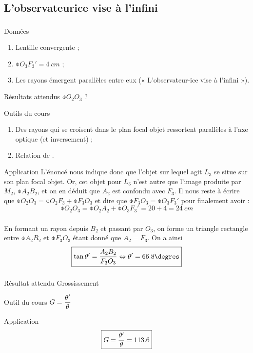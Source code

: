 \documentclass[10pt,a5paper,notitlepage]{book}
\begin{document}
\subsection{L'observateurice vise à l'infini}
\subsubsection{}
\begin{NCdefi}{Données}
    \begin{enumerate}
        \item Lentille convergente ;
        \item $\obar{O_3F_3'} = \SI{4}{cm}$ ;
        \item Les rayons émergent parallèles entre eux (« L'observateur-ice vise
            à l'infini »).
    \end{enumerate}
\end{NCdefi}

\begin{NCprop}{Résultats attendus}
    $\obar{O_2O_3}$ ?
\end{NCprop}

\begin{NCdemo}{Outils du cours}
    \begin{enumerate}

        \item Des rayons qui se croisent dans le plan focal objet ressortent
            parallèles à l'axe optique (et inversement) ;

        \item Relation de .
    \end{enumerate}
\end{NCdemo}

\begin{NCexem}{Application}
    L'énoncé nous indique donc que l'objet sur lequel agit $L_3$ se situe sur
    son plan focal objet. Or, cet objet pour $L_3$ n'est autre que l'image
    produite par $M_2$, $\obar{A_2B_2}$, et on en déduit que $A_2$ est confondu
    avec $F_3$. Il nous reste à écrire que $\obar{O_2O_3} = \obar{O_2F_3} +
    \obar{F_3O_3}$ et dire que $\obar{F_3O_3} = \obar{O_3F_3'}$ pour finalement
    avoir :
    \[ \boxed{\obar{O_2O_3} = \obar{O_2A_2} + \obar{O_3F_3'} = 20 + 4 =
    \SI{24}{cm}} \]
\end{NCexem}

\subsubsection{}
En formant un rayon depuis $B_2$ et passant par $O_3$, on forme un triangle
rectangle entre $\obar{A_2B_2}$ et $ \obar{F_3O_3}$ étant donné que $A_2 = F_3$.
On a ainsi \[ \boxed{\tan\t' = \frac{A_2B_2}{F_3O_3} \Leftrightarrow \t' =
66.8\degres}\]

\subsubsection{}
\begin{NCprop}{Résultat attendu}
    Grossissement
\end{NCprop}

\begin{NCdemo}{Outil du cours}
    $ \displaystyle G = \frac{\theta'}{\theta}$
\end{NCdemo}

\begin{NCexem}{Application}
    \[ \boxed{G = \frac{\theta'}{\theta} = 113.6} \]
\end{NCexem}
\end{document}
